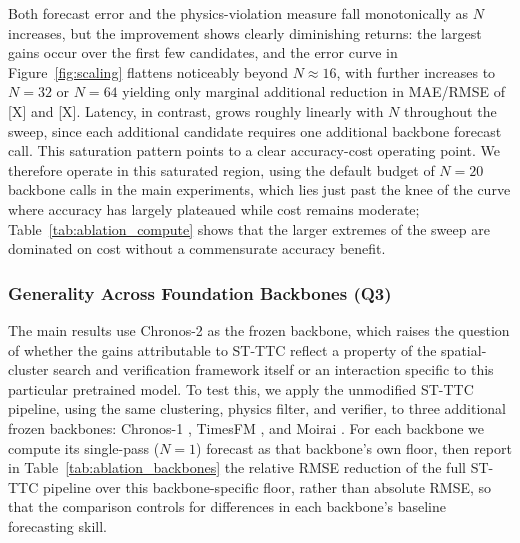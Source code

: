 \documentclass[preprint,12pt]{elsarticle}
\begin{document}
Both forecast error and the physics-violation measure fall monotonically as $N$ increases, but the improvement shows clearly diminishing returns: the largest gains occur over the first few candidates, and the error curve in Figure~\ref{fig:scaling} flattens noticeably beyond $N \approx 16$, with further increases to $N=32$ or $N=64$ yielding only marginal additional reduction in MAE/RMSE of [X] and [X]. Latency, in contrast, grows roughly linearly with $N$ throughout the sweep, since each additional candidate requires one additional backbone forecast call. This saturation pattern points to a clear accuracy-cost operating point. We therefore operate in this saturated region, using the default budget of $N=20$ backbone calls in the main experiments, which lies just past the knee of the curve where accuracy has largely plateaued while cost remains moderate; Table~\ref{tab:ablation_compute} shows that the larger extremes of the sweep are dominated on cost without a commensurate accuracy benefit.

\subsubsection{Generality Across Foundation Backbones (Q3)}
\label{sec:ablation_backbones}

The main results use Chronos-2 \citep{ansari2025chronos2} as the frozen backbone, which raises the question of whether the gains attributable to ST-TTC reflect a property of the spatial-cluster search and verification framework itself or an interaction specific to this particular pretrained model. To test this, we apply the unmodified ST-TTC pipeline, using the same clustering, physics filter, and verifier, to three additional frozen backbones: Chronos-1 \citep{ansari2024chronos}, TimesFM \citep{das2024timesfm}, and Moirai \citep{woo2024moirai}. For each backbone we compute its single-pass ($N=1$) forecast as that backbone's own floor, then report in Table~\ref{tab:ablation_backbones} the relative RMSE reduction of the full ST-TTC pipeline over this backbone-specific floor, rather than absolute RMSE, so that the comparison controls for differences in each backbone's baseline forecasting skill.
\end{document}
